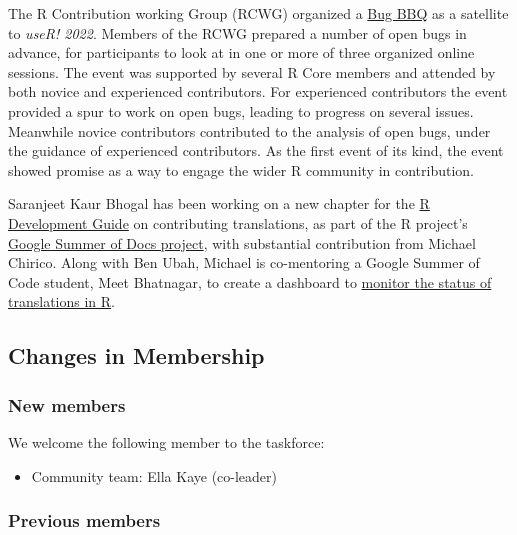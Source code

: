 The R Contribution working Group (RCWG) organized a \href{https://contributor.r-project.org/events/bug-bbq}{Bug BBQ} as a satellite to \emph{useR! 2022}. Members of the RCWG prepared a number of open bugs in advance, for participants to look at in one or more of three organized online sessions. The event was supported by several R Core members and attended by both novice and experienced contributors. For experienced contributors the event provided a spur to work on open bugs, leading to progress on several issues. Meanwhile novice contributors contributed to the analysis of open bugs, under the guidance of experienced contributors. As the first event of its kind, the event showed promise as a way to engage the wider R community in contribution.

Saranjeet Kaur Bhogal has been working on a new chapter for the \href{https://contributor.r-project.org/rdevguide/}{R Development Guide} on contributing translations, as part of the R project's \href{https://github.com/rstats-gsod/gsod2022/wiki/GSOD-2022-Proposal}{Google Summer of Docs project}, with substantial contribution from Michael Chirico. Along with Ben Ubah, Michael is co-mentoring a Google Summer of Code student, Meet Bhatnagar, to create a dashboard to \href{https://github.com/rstats-gsoc/gsoc2022/wiki/Track-R-Translations-Status}{monitor the status of translations in R}.

\hypertarget{changes-in-membership}{%
\subsection{Changes in Membership}\label{changes-in-membership}}

\hypertarget{new-members}{%
\subsubsection{New members}\label{new-members}}

We welcome the following member to the taskforce:

\begin{itemize}
\tightlist
\item
  Community team: Ella Kaye (co-leader)
\end{itemize}

\hypertarget{previous-members}{%
\subsubsection{Previous members}\label{previous-members}}

